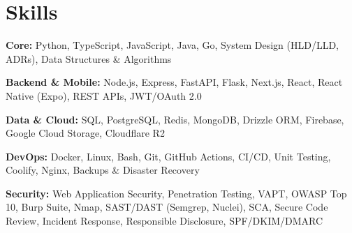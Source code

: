 \documentclass[10pt, a4paper]{article}
\begin{document}
\section{Skills}
\textbf{Core:} Python, TypeScript, JavaScript, Java, Go, System Design (HLD/LLD, ADRs), Data Structures \& Algorithms\par
\textbf{Backend \& Mobile:} Node.js, Express, FastAPI, Flask, Next.js, React, React Native (Expo), REST APIs, JWT/OAuth 2.0\par
\textbf{Data \& Cloud:} SQL, PostgreSQL, Redis, MongoDB, Drizzle ORM, Firebase, Google Cloud Storage, Cloudflare R2\par
\textbf{DevOps:} Docker, Linux, Bash, Git, GitHub Actions, CI/CD, Unit Testing, Coolify, Nginx, Backups \& Disaster Recovery\par
\textbf{Security:} Web Application Security, Penetration Testing, VAPT, OWASP Top 10, Burp Suite, Nmap, SAST/DAST (Semgrep, Nuclei), SCA, Secure Code Review, Incident Response, Responsible Disclosure, SPF/DKIM/DMARC
\end{document}
